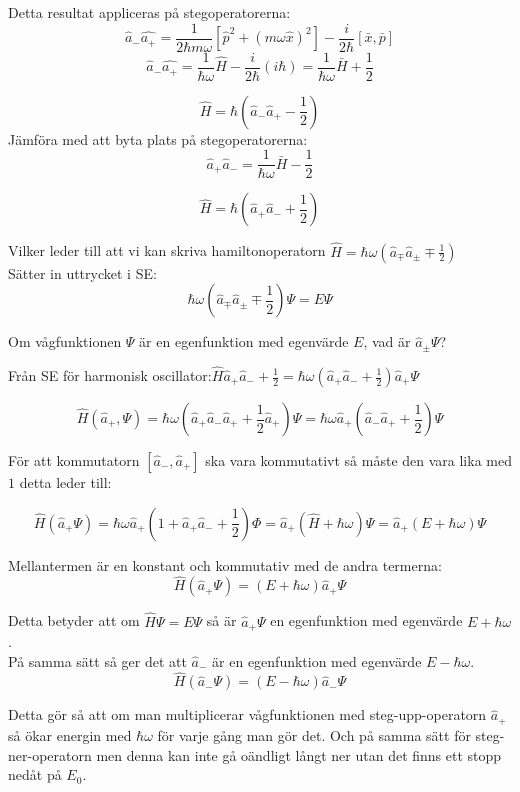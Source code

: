 \documentclass{article}
\begin{document}
  Detta resultat appliceras på stegoperatorerna:
  \[
    \hat{a}_-\hat{a_+}=\frac{1}{2\hbar m \omega}[\hat{p}^2+(m\omega\hat{x})^2]-\frac{i}{2\hbar}[\bar{x},\bar{p}]
  \]
\[
  \hat{a}_-\hat{a_+}=\frac{1}{\hbar\omega}\hat{H}-\frac{i}{2\hbar}(i\hbar)=\frac{1}{\hbar\omega}\bar{H}+\frac{1}{2}
\]

\[
  \hat{H}=\hbar(\hat{a}_-\hat{a}_+-\frac{1}{2})
\]
Jämföra med att byta plats på stegoperatorerna:
\[
  \hat{a}_+\hat{a}_-=\frac{1}{\hbar\omega}\bar{H}-\frac{1}{2}
\]

\[
  \hat{H}=\hbar(\hat{a}_+\hat{a}_-+\frac{1}{2})
\]

Vilker leder till att vi kan skriva hamiltonoperatorn $\hat{H}=\hbar\omega(\hat{a}_{\mp}\hat{a}_{\pm}\mp\frac{1}{2})$\\

Sätter in uttrycket i SE:
\[
  \hbar\omega(\hat{a}_{\mp}\hat{a}_{\pm}\mp\frac{1}{2})\Psi=E\Psi
\]

Om vågfunktionen $\Psi$ är en egenfunktion med egenvärde $E$, vad är $\hat{a}_{\pm}\Psi$?

Från SE för harmonisk oscillator:\quad $\hat{H}\hat{a}_+\hat{a}_-+\frac{1}{2}=\hbar\omega(\hat{a}_+\hat{a}_-+\frac{1}{2})\hat{a}_+\Psi$

\[
  \hat{H}(\hat{a}_+,\Psi)=\hbar\omega(\hat{a}_+\hat{a}_-\hat{a}_++\frac{1}{2}\hat{a}_+)\Psi=\hbar\omega\hat{a}_+(\hat{a}_-\hat{a}_++\frac{1}{2})\Psi
\]

För att kommutatorn $[\hat{a}_-,\hat{a}_+]$ ska vara kommutativt så måste den vara lika med $1$ detta leder till:

\[
  \hat{H}(\hat{a}_+\Psi)=\hbar\omega\hat{a}_+(1+\hat{a}_+\hat{a}_-+\frac{1}{2})\Phi=\hat{a}_+(\hat{H}+\hbar\omega)\Psi=\hat{a}_+(E+\hbar\omega)\Psi
\]

Mellantermen är en konstant och kommutativ med de andra termerna:
\[
  \hat{H}(\hat{a}_+\Psi)=(E+\hbar\omega)\hat{a}_+\Psi
\]

Detta betyder att om $\hat{H}\Psi=E\Psi$ så är $\hat{a}_+\Psi$ en egenfunktion med egenvärde $E+\hbar\omega$.\\
På samma sätt så ger det att $\hat{a}_-$ är en egenfunktion med egenvärde $E-\hbar\omega$.
\[
  \hat{H}(\hat{a}_-\Psi)=(E-\hbar\omega)\hat{a}_-\Psi
\]

Detta gör så att om man multiplicerar vågfunktionen med steg-upp-operatorn $\hat{a}_+$ så ökar energin med $\hbar\omega$ för varje gång man gör det. Och på samma sätt för steg-ner-operatorn men denna kan inte gå oändligt långt ner utan det finns ett stopp nedåt på $E_0$.
\end{document}
